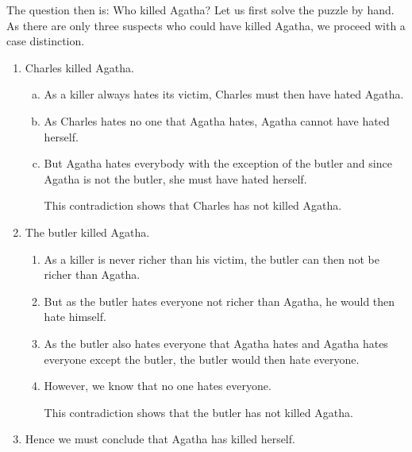 


\noindent
The question then is: Who killed Agatha?  Let us first solve the puzzle by hand.  As there are only three
suspects who could have killed Agatha, we proceed with a case distinction.
\begin{enumerate}
\item Charles killed Agatha.
  \begin{enumerate}[(a)]
  \item As a killer always hates its victim, Charles must then have hated Agatha.
  \item As Charles hates no one that Agatha hates, Agatha cannot have hated herself.
  \item But Agatha hates everybody with the exception of the butler and since Agatha is not the
        butler, she must have hated herself.

        This contradiction shows that Charles has not killed Agatha.
  \end{enumerate}
\item The butler killed Agatha.
  \begin{enumerate}
  \item As a killer is never richer than his victim, the butler can then not be richer than Agatha.
  \item But as the butler hates everyone not richer than Agatha, he would then hate himself.
  \item As the butler also hates everyone that Agatha hates and Agatha hates everyone except the butler,
        the butler would then hate everyone.
  \item However, we know that no one hates everyone.

        This contradiction shows that the butler has not killed Agatha.      
  \end{enumerate}
\item Hence we must conclude that Agatha has killed herself.
\end{enumerate}
